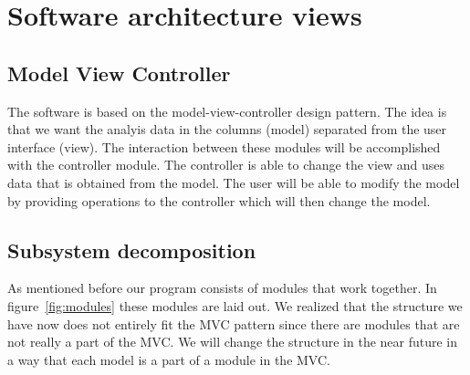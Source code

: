 \documentclass[a4paper]{article}
\begin{document}
\section{Software architecture views}

\subsection{Model View Controller}
\label{subsec:mvc}
The software is based on the model-view-controller design pattern. The idea is that we want the analyis data in the columns (model) separated from the user interface (view). The interaction between these modules will be accomplished with the controller module. The controller is able to change the view and uses data that is obtained from the model. The user will be able to modify the model by providing operations to the controller which will then change the model.

\subsection{Subsystem decomposition}

As mentioned before our program consists of modules that work together. In figure~\ref{fig:modules} these modules are laid out. We realized that the structure we have now does not entirely fit the MVC pattern since there are modules that are not really a part of the MVC. We will change the structure in the near future in a way that each model is a part of a module in the MVC.
\end{document}
